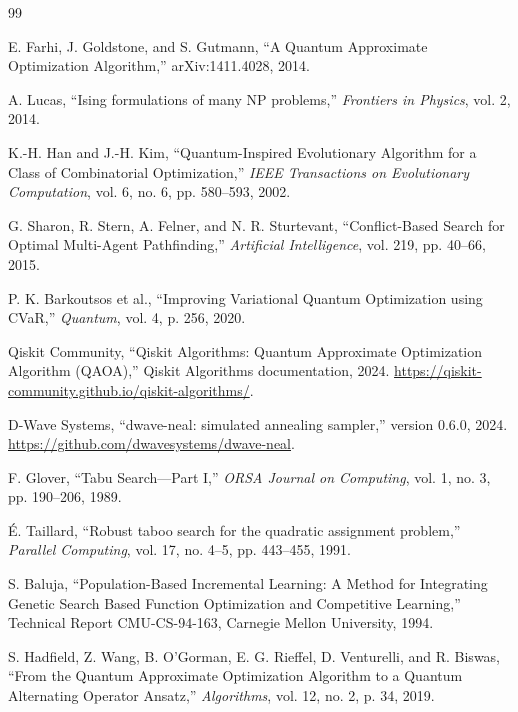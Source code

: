 \documentclass[12pt, a4paper]{article}
\begin{document}
\begin{thebibliography}{99}

E. Farhi, J. Goldstone, and S. Gutmann,
``A Quantum Approximate Optimization Algorithm,''
arXiv:1411.4028, 2014.

A. Lucas,
``Ising formulations of many NP problems,''
\textit{Frontiers in Physics},
vol. 2, 2014.

K.-H. Han and J.-H. Kim,
``Quantum-Inspired Evolutionary Algorithm for a Class of Combinatorial Optimization,''
\textit{IEEE Transactions on Evolutionary Computation},
vol. 6, no. 6, pp. 580--593, 2002.

G. Sharon, R. Stern, A. Felner, and N. R. Sturtevant,
``Conflict-Based Search for Optimal Multi-Agent Pathfinding,''
\textit{Artificial Intelligence},
vol. 219, pp. 40--66, 2015.

P. K. Barkoutsos et al.,
``Improving Variational Quantum Optimization using CVaR,''
\textit{Quantum},
vol. 4, p. 256, 2020.

Qiskit Community,
``Qiskit Algorithms: Quantum Approximate Optimization Algorithm (QAOA),''
Qiskit Algorithms documentation, 2024. \url{https://qiskit-community.github.io/qiskit-algorithms/}.

D-Wave Systems,
``dwave-neal: simulated annealing sampler,'' version 0.6.0, 2024. \url{https://github.com/dwavesystems/dwave-neal}.

F. Glover,
``Tabu Search---Part I,''
\textit{ORSA Journal on Computing}, vol. 1, no. 3, pp. 190--206, 1989.

\'E. Taillard,
``Robust taboo search for the quadratic assignment problem,''
\textit{Parallel Computing}, vol. 17, no. 4--5, pp. 443--455, 1991.

S. Baluja,
``Population-Based Incremental Learning: A Method for Integrating Genetic Search Based Function Optimization and Competitive Learning,''
Technical Report CMU-CS-94-163, Carnegie Mellon University, 1994.

S. Hadfield, Z. Wang, B. O'Gorman, E. G. Rieffel, D. Venturelli, and R. Biswas,
``From the Quantum Approximate Optimization Algorithm to a Quantum Alternating Operator Ansatz,''
\textit{Algorithms}, vol. 12, no. 2, p. 34, 2019.


\end{thebibliography}
\end{document}
